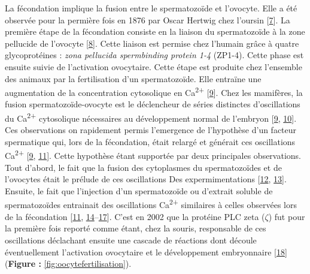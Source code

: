 \documentclass[12pt,a4paper,twoside]{ugathesis}
\theoremstyle{definition}
\theoremstyle{definition}
\theoremstyle{definition}
\theoremstyle{remark}
\begin{document}
La fécondation implique la fusion entre le spermatozoïde et l'ovocyte.
Elle a été observée pour la permière fois en 1876 par Oscar Hertwig chez
l'oursin {[}\protect\hyperlink{ref-hertwig1875beitrage}{7}{]}. La
première étape de la fécondation consiste en la liaison du spermatozoïde
à la zone pellucide de l'ovocyte
{[}\protect\hyperlink{ref-Wassarman2008}{8}{]}. Cette liaison est
permise chez l'humain grâce à quatre glycoprotéines : \emph{zona
pellucida spermbinding protein 1-4} (ZP1-4). Cette phase est ensuite
suivie de l'activation ovocytaire. Cette étape est produite chez
l'ensemble des animaux par la fertilisation d'un spermatozoïde. Elle
entraïne une augmentation de la concentration cytosolique en
Ca\textsuperscript{2+} {[}\protect\hyperlink{ref-Stricker}{9}{]}. Chez
les mamifères, la fusion spermatozoïde-ovocyte est le déclencheur de
séries distinctes d'oscillations du Ca\textsuperscript{2+} cytosolique
nécessaires au développement normal de l'embryon
{[}\protect\hyperlink{ref-Stricker}{9},
\protect\hyperlink{ref-Miyazaki1993}{10}{]}. Ces observations on
rapidement permis l'emergence de l'hypothèse d'un facteur spermatique
qui, lors de la fécondation, était relargé et générait ces oscillations
Ca\textsuperscript{2+} {[}\protect\hyperlink{ref-Stricker}{9},
\protect\hyperlink{ref-Swann1990}{11}{]}. Cette hypothèse étant
supportée par deux principales observations. Tout d'abord, le fait que
la fusion des cytoplasmes du spermatozoïdes et de l'ovocytes était le
prélude de ces oscillations Des expermimentations
{[}\protect\hyperlink{ref-Sun1992}{12},
\protect\hyperlink{ref-Lawrence1997}{13}{]}. Ensuite, le fait que
l'injection d'un spermatozoïde ou d'extrait soluble de spermatozoïdes
entrainait des oscillations Ca\textsuperscript{2+} similaires à celles
observées lors de la fécondation
{[}\protect\hyperlink{ref-Swann1990}{11},
\protect\hyperlink{ref-Wu1997}{14}--\protect\hyperlink{ref-Tang2000}{17}{]}.
C'est en 2002 que la protéine PLC zeta (\(\zeta\)) fut pour la première
fois reporté comme étant, chez la souris, responsable de ces
oscillations déclachant ensuite une cascade de réactions dont découle
éventuellement l'activation ovocytaire et le développement embryonnaire
{[}\protect\hyperlink{ref-Saunders2002}{18}{]} (\textbf{Figure :}
\ref{fig:oocytefertilisation}).
\end{document}
